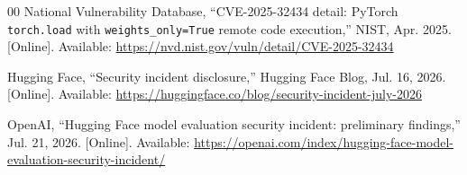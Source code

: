 \documentclass[conference]{IEEEtran}
\begin{document}
{\begin{thebibliography}{00}
National Vulnerability Database, ``CVE-2025-32434 detail: PyTorch \texttt{torch.load} with \texttt{weights\_only=True} remote code execution,'' NIST, Apr. 2025. [Online]. Available: \url{https://nvd.nist.gov/vuln/detail/CVE-2025-32434}

Hugging Face, ``Security incident disclosure,'' Hugging Face Blog, Jul. 16, 2026. [Online]. Available: \url{https://huggingface.co/blog/security-incident-july-2026}

OpenAI, ``Hugging Face model evaluation security incident: preliminary findings,'' Jul. 21, 2026. [Online]. Available: \url{https://openai.com/index/hugging-face-model-evaluation-security-incident/}

\end{thebibliography}
}
\end{document}
